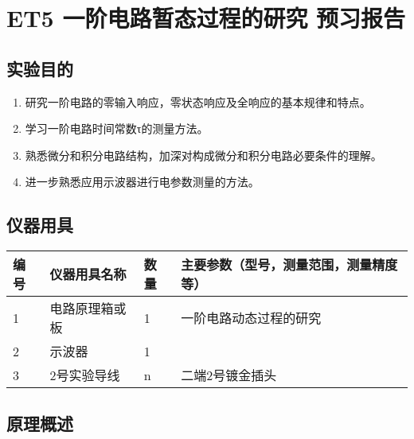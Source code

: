 \documentclass[dvipsnames, svgnames,a4paper,11pt]{article}
\begin{document}
	
	
	
	\setcounter{section}{0}
	\section{ET5 一阶电路暂态过程的研究 \quad\heiti 预习报告}
	
	\subsection{实验目的}
	\begin{enumerate}
		\item 研究一阶电路的零输入响应，零状态响应及全响应的基本规律和特点。
		\item 学习一阶电路时间常数τ的测量方法。
		\item 熟悉微分和积分电路结构，加深对构成微分和积分电路必要条件的理解。
		\item 进一步熟悉应用示波器进行电参数测量的方法。
		
	\end{enumerate}
	
	\subsection{仪器用具}
	\begin{table}[htbp]
		\centering
		\renewcommand\arraystretch{1.6}
		\begin{tabular}{p{}|p{}|p{}|p{}}
			\hline
			编号& 仪器用具名称 & 数量 &  主要参数（型号，测量范围，测量精度等） \\
			\hline
			1& 电路原理箱或板 & 1 & 一阶电路动态过程的研究 \\
	
			2& 示波器 & 1 &  \\
			
			3& 2号实验导线 & n & 二端2号镀金插头  \\
			\hline

		\end{tabular}
	\end{table}
	
	\subsection{原理概述}
	
\end{document}
